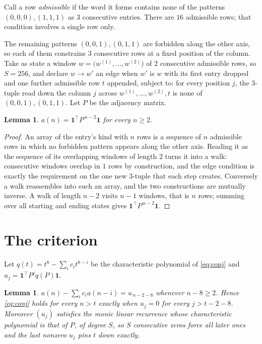 \documentclass[11pt,a4paper]{article}
\theoremstyle{plain}
\newtheorem{lemma}[theorem]{Lemma}
\theoremstyle{definition}
\begin{document}
Call a row \emph{admissible} if the word it forms contains none of the patterns
$(0,0,0), (1,1,1)$ as $3$ consecutive entries. There are $16$ admissible rows; that condition
involves a single row only.

The remaining patterns $(0,0,1), (0,1,1)$ are forbidden along the other axis, so each of them
constrains $3$ consecutive rows at a fixed position of the column. Take as state a
window $w=\bigl(w^{(1)},\dots,w^{(2)}\bigr)$ of $2$ consecutive admissible
rows, so $S=256$, and declare $w\to w'$ an edge when $w'$ is $w$ with its first entry
dropped and one further admissible row $t$ appended, subject to: for every position
$j$, the $3$-tuple read down the column $j$ across $w^{(1)},\dots,w^{(2)},t$
is none of $(0,0,1), (0,1,1)$. Let $P$ be the adjacency matrix.

\begin{lemma}\label{lem:walk}
$a(n)=\mathbf{1}^{\!\top}P^{\,n-2}\mathbf{1}$ for every $n\ge2$.
\end{lemma}

\begin{proof}
An array of the entry's kind with $n$ rows is a sequence of $n$ admissible rows in
which no forbidden pattern appears along the other axis. Reading it as the sequence of its
overlapping windows of length $2$ turns it into a walk: consecutive windows overlap in
$1$ rows by construction, and the edge condition is exactly the requirement on the one
new $3$-tuple that each step creates. Conversely a walk reassembles into such an array,
and the two constructions are mutually inverse. A walk of length $n-2$ visits $n-1$
windows, that is $n$ rows; summing over all starting and ending states gives
$\mathbf{1}^{\!\top}P^{\,n-2}\mathbf{1}$.
\end{proof}

\section{The criterion}

Let $q(t)=t^{8}-\sum_i c_i t^{8-i}$ be the characteristic polynomial of
\eqref{eq:conj} and $u_j=\mathbf{1}^{\!\top}P^{j}q(P)\mathbf{1}$.

\begin{lemma}\label{lem:crit}
$a(n)-\sum_i c_i a(n-i)=u_{\,n-2-8}$ whenever $n-8\ge2$. Hence
\eqref{eq:conj} holds for every $n>t$ exactly when $u_j=0$ for every
$j>t-2-8$. Moreover $(u_j)$ satisfies the monic linear recurrence whose
characteristic polynomial is that of $P$, of degree $S$, so $S$ consecutive zeros force all
later ones and the last nonzero $u_j$ pins $t$ down exactly.
\end{lemma}
\end{document}
